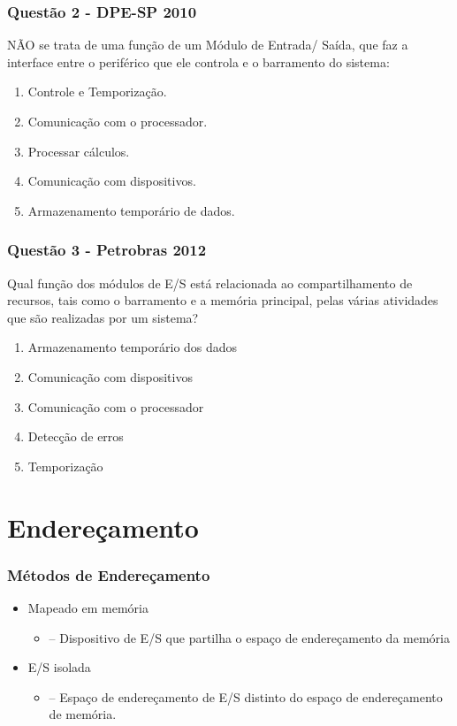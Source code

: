 \documentclass[aspectratio=169,
				xcolor=table]{beamer}
\begin{document}
	\begin{frame}
		\frametitle{Questão 2 - DPE-SP 2010}
		NÃO se trata de uma função de um Módulo de Entrada/ Saída, que faz a interface entre o periférico que ele controla e o barramento do sistema:
		\vspace{1em}
		\begin{enumerate}[a]
			\item Controle e Temporização.
			\item Comunicação com o processador.
			\item Processar cálculos.
			\item Comunicação com dispositivos.
			\item Armazenamento temporário de dados.		
		\end{enumerate}

	\end{frame}	
	
	\begin{frame}
		\frametitle{Questão 3 - Petrobras 2012}
		Qual função dos módulos de E/S está relacionada ao compartilhamento de recursos, tais como o barramento e a memória principal, pelas várias atividades que são realizadas por um sistema?
		\vspace{1em}
		\begin{enumerate}[a]
			\item Armazenamento temporário dos dados
			\item Comunicação com dispositivos
			\item Comunicação com o processador
			\item Detecção de erros 
			\item Temporização		
		\end{enumerate}
	\end{frame}
	
	\section{Endereçamento}	
	\begin{frame}
		\frametitle{Métodos de Endereçamento}
		\begin{itemize}
			\item Mapeado em memória
			\begin{itemize}
				\item – Dispositivo de E/S que partilha o espaço de endereçamento da memória
			\end{itemize}
			\vspace{1em}
			\item E/S isolada
			\begin{itemize}
				\item – Espaço de endereçamento de E/S distinto do espaço de
endereçamento de memória.
			\end{itemize}
		\end{itemize}		
	\end{frame}
	
\end{document}

